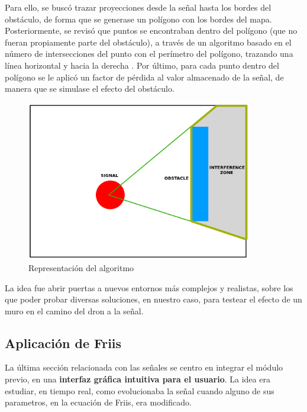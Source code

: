 Para ello, se buscó trazar proyecciones desde la señal hasta los bordes del obstáculo, de forma que se generase un polígono con los bordes del mapa. Posteriormente, se revisó que puntos se encontraban dentro del polígono (que no fueran propiamente parte del obstáculo), a través de un algoritmo basado en el número de intersecciones del punto con el perímetro del polígono, trazando una línea horizontal y hacia la derecha \cite{poly-info}. Por último, para cada punto dentro del polígono se le aplicó un factor de pérdida al valor almacenado de la señal, de manera que se simulase el efecto del obstáculo.\\

\begin{figure} [H]
	\begin{center}
	\includegraphics[height=7cm]{imagenes/cap4/5_interference.png}
	\end{center}
	\caption[Representación del algoritmo]{Representación del algoritmo}
	\label{fig:interference_algorithm}
\end{figure}

La idea fue abrir puertas a nuevos entornos más complejos y realistas, sobre los que poder probar diversas soluciones, en nuestro caso, para testear el efecto de un muro en el camino del dron a la señal.\\
\newpage
\subsection{Aplicación de Friis}
\label{subsec:friis-app}

La última sección relacionada con las señales se centro en integrar el módulo previo, en una \textbf{interfaz gráfica intuitiva para el usuario}. La idea era estudiar, en tiempo real, como evolucionaba la señal cuando alguno de sus parametros, en la ecuación de Friis, era modificado.\\

